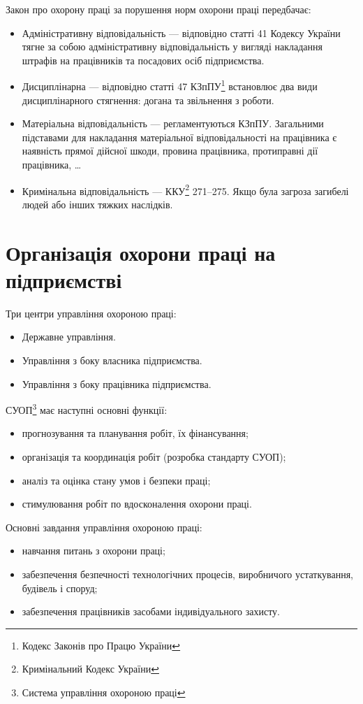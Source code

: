 \documentclass[a4paper,10pt,notitlepage,pdftex,headsepline]{scrartcl}
\begin{document}
  Закон про охорону праці за порушення норм охорони праці передбачає:
  \begin{itemize}
    \item Адміністративну відповідальність --- відповідно статті 41 Кодексу
      України тягне за собою адміністративну відповідальність у вигляді
      накладання штрафів на працівників та посадових осіб підприємства.
    \item Дисциплінарна --- відповідно статті 47 КЗпПУ\footnote{Кодекс Законів
      про Працю України} встановлює два види дисциплінарного стягнення: догана
      та звільнення з роботи.
    \item Матеріальна відповідальність --- регламентуються КЗпПУ.
      Загальними підставами для накладання матеріальної відповідальності на
      працівника є наявність прямої дійсної шкоди, провина працівника,
      протиправні дії працівника, \ldots
    \item Кримінальна відповідальність --- ККУ\footnote{Кримінальний Кодекс
      України} 271--275.
      Якщо була загроза загибелі людей або інших тяжких наслідків.
  \end{itemize}

\section{Організація охорони праці на підприємстві}
  Три центри управління охороною праці:
  \begin{itemize}
    \item Державне управління.
    \item Управління з боку власника підприємства.
    \item Управління з боку працівника підприємства.
  \end{itemize}

  СУОП\footnote{Система управління охороною праці} має наступні основні
  функції:
  \begin{itemize}
    \item прогнозування та планування робіт, їх фінансування;
    \item організація та координація робіт (розробка стандарту СУОП);
    \item аналіз та оцінка стану умов і безпеки праці;
    \item стимулювання робіт по вдосконалення охорони праці.
  \end{itemize}

  Основні завдання управління охороною праці:
  \begin{itemize}
    \item навчання питань з охорони праці;
    \item забезпечення безпечності технологічних процесів, виробничого
      устаткування, будівель і споруд;
    \item забезпечення працівників засобами індивідуального захисту.
  \end{itemize}
\end{document}
